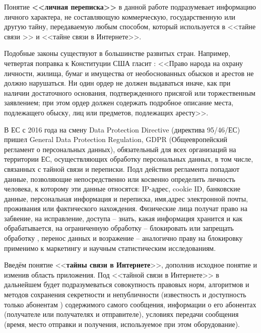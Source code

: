 Понятие \textbf{<<личная переписка>>} в данной работе  подразумевает информацию личного характера, не составляющую коммерческую, государственную или другую тайну, передаваемую любым способом,  который  используется   в <<тайне связи >> и <<тайне связи в Интернете>>.

Подобные законы существуют в большинстве развитых стран. Например, четвертая поправка  к Конституции США  гласит : <<Право народа на охрану личности, жилища, бумаг и имущества от необоснованных обысков и арестов не должно нарушаться. Ни один ордер не должен выдаваться иначе, как при наличии достаточного основания, подтвержденного присягой или торжественным заявлением; при этом ордер должен содержать подробное описание места, подлежащего обыску, лиц или предметов, подлежащих аресту>>. \cite{4Popravka}%


В ЕС  с 2016 года  на смену Data Protection Directive (директива 95/46/ЕС) пришел General Data Protection Regulation, GDPR (Общеевропейский регламент о персональных данных), обязательный для всех организаций на территории ЕС, осуществляющих  обработку персональных данных, в том числе, связанных с тайной связи и переписки.   Подл действия регламента попадают данные, позволяющие непосредственно или косвенно определить личность человека, к которому эти данные относятся: IP-адрес, cookie ID, банковские данные, персональная информация и переписка, имя,адрес электронной почты, проживания или фактического нахождения. Физические лица получат право на забвение, на исправление, доступа -- знать, какая информация хранится и как обрабатывается, на ограниченную обработку -- блокировать или запрещать обработку , перенос данных и возражение -- аналогично праву на блокировку применимо к маркетингу и научным статистическим исследованиям.\cite{EUDataProtec} 



Введём понятие <<\textbf{тайны связи в Интернете}>>, дополнив исходное понятие и изменив область приложения. Под <<тайной связи в Интернете>> в дальнейшем будет подразумеваться совокупность правовых норм, алгоритмов и методов сохранения секретности и  непубличности (известность и доступность только абонентам ) содержимого самого сообщения, информации о его абонентах (получателе или получателях и отправителе), условиях передачи сообщения (время, место отправки и получения, используемое при этом оборудование). 

